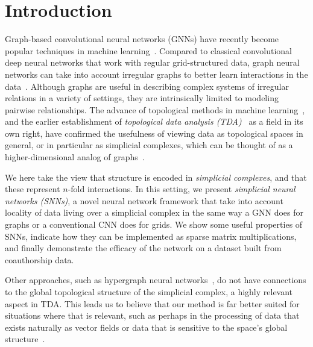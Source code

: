 \section{Introduction}

Graph-based convolutional neural networks (GNNs) have recently become popular techniques in machine learning~\cite{defferrard2016convolutional, bronstein2017geometric, wu2020survey}. Compared to classical convolutional deep neural networks that work with regular grid-structured data, graph neural networks can take into account irregular graphs to better learn interactions in the data~\cite{battaglia2018relational}. Although graphs are useful in describing complex systems of irregular relations in a variety of settings, they are intrinsically limited to modeling pairwise relationships. The advance of topological methods in machine learning~\cite{Gabrielsson2020topological, Hofer2019LearningRO, rieck2018neural}, and the earlier establishment of \emph{topological data analysis (TDA)}~\cite{carlsson2008,chazal2017,edelsbrunner2010computational,ghrist2008barcodes} as a field in its own right, have confirmed the usefulness of viewing data as topological spaces in general, or in particular as simplicial complexes, which can be thought of as a higher-dimensional analog of graphs~\cite{moore2012,patania2017}.

We here take the view that structure is encoded in \emph{simplicial complexes}, and that these represent $n$-fold interactions. In this setting, we present \emph{simplicial neural networks (SNNs)}, a novel neural network framework that take into account locality of data living over a simplicial complex in the same way a GNN does for graphs or a conventional CNN does for grids. We show some useful properties of SNNs, indicate how they can be implemented as sparse matrix multiplications, and finally demonstrate the efficacy of the network on a dataset built from coauthorship data.

Other approaches, such as hypergraph neural networks~\cite{feng2018hypergraphs}, do not have connections to the global topological structure of the simplicial complex, a highly relevant aspect in TDA. This leads us to believe that our method is far better suited for situations where that is relevant, such as perhaps in the processing of data that exists naturally as vector fields or data that is sensitive to the space's global structure~\cite{perraudin2019deepsphere}.
